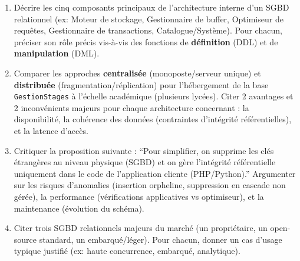 \documentclass[11pt]{article}
\begin{document}
\begin{exercice}
\label{exo:archi}
\begin{enumerate}
    \item Décrire les cinq composants principaux de l'architecture interne d'un SGBD relationnel (ex: Moteur de stockage, Gestionnaire de buffer, Optimiseur de requêtes, Gestionnaire de transactions, Catalogue/Système). Pour chacun, préciser son rôle précis vis-à-vis des fonctions de \textbf{définition} (DDL) et de \textbf{manipulation} (DML).
    \item Comparer les approches \textbf{centralisée} (monoposte/serveur unique) et \textbf{distribuée} (fragmentation/réplication) pour l'hébergement de la base \texttt{GestionStages} à l'échelle académique (plusieurs lycées). Citer 2 avantages et 2 inconvénients majeurs pour chaque architecture concernant : la disponibilité, la cohérence des données (contraintes d'intégrité référentielles), et la latence d'accès.
    \item Critiquer la proposition suivante : ``Pour simplifier, on supprime les clés étrangères au niveau physique (SGBD) et on gère l'intégrité référentielle uniquement dans le code de l'application cliente (PHP/Python).'' Argumenter sur les risques d'anomalies (insertion orpheline, suppression en cascade non gérée), la performance (vérifications applicatives vs optimiseur), et la maintenance (évolution du schéma).
    \item Citer trois SGBD relationnels majeurs du marché (un propriétaire, un open-source standard, un embarqué/léger). Pour chacun, donner un cas d'usage typique justifié (ex: haute concurrence, embarqué, analytique).
\end{enumerate}
\end{exercice}
\end{document}
